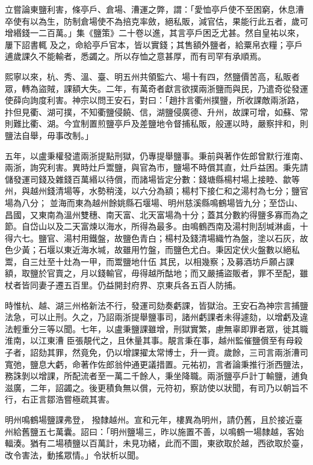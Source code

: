 \begin{pinyinscope}
 立嘗論東鹽利害，條亭戶、倉場、漕運之弊，謂：「愛恤亭戶使不至困窮，休息漕卒使有以為生，防制倉場使不為掊克率斂，絕私販，減官估，果能行此五者，歲可增緡錢一二百萬。」集《鹽策》二十卷以進，其言亭戶困乏尤甚。然自皇祐以來，屢下詔書輒
 及之，命給亭戶官本，皆以實錢；其售額外鹽者，給粟帛衣糧；亭戶逋歲課久不能輸者，悉蠲之。所以存恤之意甚厚，而有司罕有承順焉。



 熙寧以來，杭、秀、溫、臺、明五州共領監六、場十有四，然鹽價苦高，私販者眾，轉為盜賊，課額大失。二年，有萬奇者獻言欲撲兩浙鹽而與民，乃遣奇從發運使薛向詢度利害。神宗以問王安石，對曰：「趙抃言衢州撲鹽，所收課敵兩浙路，抃但見衢、湖可撲，不知衢鹽侵饒、信，湖鹽侵廣德、升州，故課可增，如蘇、常
 則難比衢、湖。今宜制置煎鹽亭戶及差鹽地令督捕私販，般運以時，嚴察拌和，則鹽法自舉，毋事改制。」



 五年，以盧秉權發遣兩浙提點刑獄，仍專提舉鹽事。秉前與著作佐郎曾默行淮南、兩浙，詢究利害。異時灶戶鬻鹽，與官為市，鹽場不時償其直，灶戶益困。秉先請儲發運司錢及雜錢百萬緡以待償，而諸場皆定分數：錢塘縣楊村場上接睦、歙等州，與越州錢清場等，水勢稍淺，以六分為額；楊村下接仁和之湯村為七分；鹽官場為八分；
 並海而東為越州餘姚縣石堰場、明州慈溪縣鳴鶴場皆九分；至岱山、昌國，又東南為溫州雙穗、南天富、北天富場為十分；蓋其分數約得鹽多寡而為之節。自岱山以及二天富煉以海水，所得為最多。由鳴鶴西南及湯村則刮堿淋鹵，十得六七。鹽官、湯村用鐵盤，故鹽色青白；楊村及錢清場織竹為盤，塗以石灰，故色少黃；石堰以東近海水堿，故雖用竹盤，而鹽色尤白。秉因定伏火盤數以絕私鬻，自三灶至十灶為一甲，而鬻鹽地什伍
 其民，以相幾察；及募酒坊戶願占課額，取鹽於官賣之，月以錢輸官，毋得越所酤地；而又嚴捕盜販者，罪不至配，雖杖者皆同妻子遷五百里。仍益開封府界、京東兵各五百人防捕。



 時惟杭、越、湖三州格新法不行，發運司劾奏虧課，皆獄治。王安石為神宗言捕鹽法急，可以止刑。久之，乃詔兩浙提舉鹽事司，諸州虧課者未得遽劾，以增虧及違法輕重分三等以聞。七年，以盧秉鹽課雖增，刑獄實繁，慮無辜即罪者眾，徙其職淮南，以江東漕
 臣張靚代之，且休量其事。靚言秉在事，越州監催鹽償至有母殺子者，詔劾其罪，然竟免，仍以增課擢太常博士，升一資。歲餘，三司言兩浙漕司寬弛，鹽息大虧，命著作佐郎翁仲通更議措置。元祐初，言者論秉推行浙西鹽法，務誅剝以增課，所配流者至一萬二千餘人，秉坐降職。兩浙鹽亭戶計丁輸鹽，逋負滋廣，二年，詔蠲之。後更積負無以償，元符初，察訪使以狀聞，有司乃以朝旨不行，右正言鄒浩嘗極疏其害。



 明州鳴鶴場鹽課弗登，
 撥隸越州。宣和元年，樓異為明州，請仍舊，且於接近臺州給舊鹽五七萬囊。詔曰：「明州鹽場三，昨以施置不善，以鳴鶴一場隸越，客始輻湊。猶有二場積鹽以百萬計，未見功緒，此而不圖，東欲取於越，西欲取於臺，改令害法，動搖眾情。」令狀析以聞。




\end{pinyinscope}
